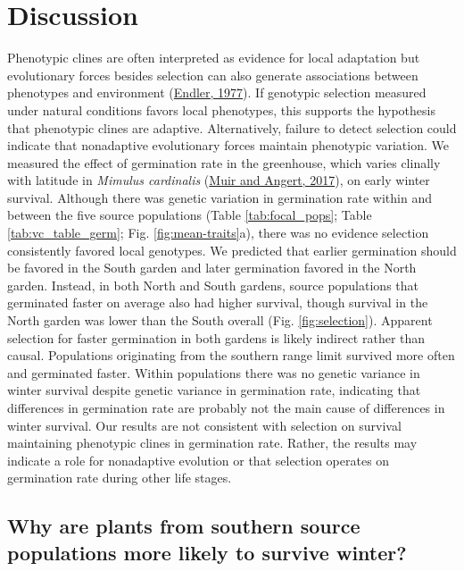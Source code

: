 \documentclass[
  12pt,
]{article}
\begin{document}
\hypertarget{discussion}{%
\section{Discussion}\label{discussion}}

Phenotypic clines are often interpreted as evidence for local adaptation but evolutionary forces besides selection can also generate associations between phenotypes and environment (\protect\hyperlink{ref-endler_geographic_1977}{Endler, 1977}). If genotypic selection measured under natural conditions favors local phenotypes, this supports the hypothesis that phenotypic clines are adaptive. Alternatively, failure to detect selection could indicate that nonadaptive evolutionary forces maintain phenotypic variation. We measured the effect of germination rate in the greenhouse, which varies clinally with latitude in \emph{Mimulus cardinalis} (\protect\hyperlink{ref-muir_grow_2017}{Muir and Angert, 2017}), on early winter survival. Although there was genetic variation in germination rate within and between the five source populations (Table \ref{tab:focal_pops}; Table \ref{tab:vc_table_germ}; Fig. \ref{fig:mean-traits}a), there was no evidence selection consistently favored local genotypes. We predicted that earlier germination should be favored in the South garden and later germination favored in the North garden. Instead, in both North and South gardens, source populations that germinated faster on average also had higher survival, though survival in the North garden was lower than the South overall (Fig. \ref{fig:selection}). Apparent selection for faster germination in both gardens is likely indirect rather than causal. Populations originating from the southern range limit survived more often and germinated faster. Within populations there was no genetic variance in winter survival despite genetic variance in germination rate, indicating that differences in germination rate are probably not the main cause of differences in winter survival. Our results are not consistent with selection on survival maintaining phenotypic clines in germination rate. Rather, the results may indicate a role for nonadaptive evolution or that selection operates on germination rate during other life stages.

\hypertarget{why-are-plants-from-southern-source-populations-more-likely-to-survive-winter}{%
\subsection{Why are plants from southern source populations more likely to survive winter?}\label{why-are-plants-from-southern-source-populations-more-likely-to-survive-winter}}
\end{document}
